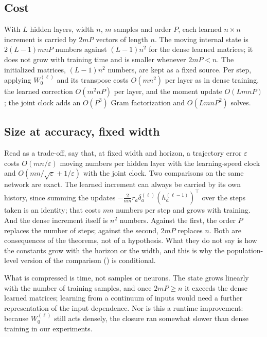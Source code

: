 \documentclass[11pt]{article}
\theoremstyle{definition}
\theoremstyle{remark}
\begin{document}
\subsection{Cost}

With $L$ hidden layers, width $n$, $m$ samples and order $P$, each learned
$n\times n$ increment is carried by $2mP$ vectors of length $n$.  The moving
internal state is $2(L-1)mnP$ numbers against $(L-1)n^2$ for the dense learned
matrices; it does not grow with training time and is smaller whenever $2mP<n$.
The initialized matrices, $(L-1)n^2$ numbers, are kept as a fixed source.  Per
step, applying $W_0^{(\ell)}$ and its transpose costs $O(mn^2)$ per layer as in
dense training, the learned correction $O(m^2nP)$ per layer, and the moment
update $O(LmnP)$; the joint clock adds an $O(P^3)$ Gram factorization and
$O(LmnP^2)$ solves.

\subsection{Size at accuracy, fixed width}
\label{sec:size}

Read as a trade-off,  say that, at fixed width and
horizon, a trajectory error $\varepsilon$ costs $O(mn/\varepsilon)$ moving
numbers per hidden layer with the learning-speed clock and
$O(mn/\sqrt{\varepsilon}+1/\varepsilon)$ with the joint clock.  Two comparisons
on the same network are exact.  The learned increment can always be carried
by its own history, since summing the updates
$-\frac{2}{nm}r_a\delta^{(\ell)}_a(h^{(\ell-1)}_a)^\top$ over the steps taken
is an identity; that costs $mn$ numbers per step and grows with training.  And
the dense increment itself is $n^2$ numbers.  Against the first, the order $P$
replaces the number of steps; against the second, $2mP$ replaces $n$.  Both are
consequences of the theorems, not of a hypothesis.  What they do not say is how
the constants grow with the horizon or the width, and this is why the
population-level version of the comparison () is conditional.

What is compressed is time, not samples or neurons.  The state grows linearly
with the number of training samples, and once $2mP\ge n$ it exceeds the dense
learned matrices; learning from a continuum of inputs would need a further
representation of the input dependence.  Nor is this a runtime improvement:
because $W_0^{(\ell)}$ still acts densely, the closure ran somewhat slower than
dense training in our experiments.
\end{document}
